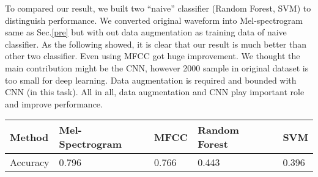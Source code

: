 To compared our result, we built two ``naive'' classifier (Random Forest, SVM) to distinguish performance. We converted original waveform into Mel-spectrogram same as Sec.\ref{pre} but with out data augmentation as training data of naive classifier.
As the following showed, it is clear that our result is much better than other two classifier. Even using MFCC got huge improvement. We thought the main contribution might be the CNN, however 2000 sample in original dataset is too small for deep learning. Data augmentation is required and bounded with CNN (in this task). All in all, data augmentation and CNN play important role and improve performance.

\begin{center}
\begin{tabular}[t]{lllll}
\hline 
    Method & \textbf{Mel-Spectrogram} & \textbf{MFCC} & Random Forest & SVM \\
\hline
Accuracy & 0.796 & 0.766 & 0.443 & 0.396\\
\hline
\end{tabular}
\end{center}
